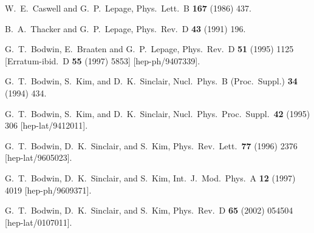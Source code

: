 \begin{thebibliography}{999}



W.~E.~Caswell and G.~P.~Lepage,
Phys.\ Lett.\ B {\bf 167} (1986) 437.

B.~A.~Thacker and G.~P.~Lepage,
Phys.\ Rev.\ D {\bf 43} (1991) 196.

G.~T.~Bodwin, E.~Braaten and G.~P.~Lepage,
Phys.\ Rev.\ D {\bf 51} (1995) 1125
[Erratum-ibid.\ D {\bf 55} (1997) 5853]
[hep-ph/9407339].

G.~T.~Bodwin, S.~Kim, and D.~K.~Sinclair,
Nucl.\ Phys.\ B (Proc.\ Suppl.)  {\bf 34} (1994) 434.

G.~T.~Bodwin, S.~Kim, and D.~K.~Sinclair,
Nucl.\ Phys.\ Proc.\ Suppl.\
{\bf 42} (1995) 306
[hep-lat/9412011].

G.~T.~Bodwin, D.~K.~Sinclair, and S.~Kim,
Phys.\ Rev.\ Lett.\  {\bf 77} (1996) 2376
[hep-lat/9605023].

G.~T.~Bodwin, D.~K.~Sinclair, and S.~Kim,
Int.\ J.\ Mod.\ Phys.\ A {\bf 12} (1997) 4019
[hep-ph/9609371].

G.~T.~Bodwin, D.~K.~Sinclair, and S.~Kim,
Phys.\ Rev.\ D {\bf 65} (2002) 054504
[hep-lat/0107011].


\end{thebibliography}
